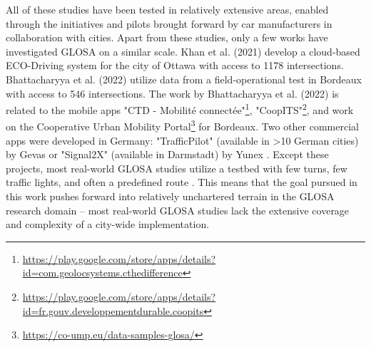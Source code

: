 All of these studies have been tested in relatively extensive areas, enabled through the initiatives and pilots brought forward by car manufacturers in collaboration with cities. Apart from these studies, only a few works have investigated GLOSA on a similar scale. Khan et al. (2021) \cite{khan_eco-drive_2021} develop a cloud-based ECO-Driving system for the city of Ottawa with access to 1178 intersections. Bhattacharyya et al. (2022) \cite{bhattacharyya_assessing_2022} utilize data from a field-operational test in Bordeaux with access to 546 intersections. The work by Bhattacharyya et al. (2022) \cite{bhattacharyya_assessing_2022} is related to the mobile apps "CTD - Mobilité connectée"\footnote{\url{https://play.google.com/store/apps/details?id=com.geolocsystems.cthedifference}}, "CoopITS"\footnote{\url{https://play.google.com/store/apps/details?id=fr.gouv.developpementdurable.coopits}}, and work on the Cooperative Urban Mobility Portal\footnote{\url{https://co-ump.eu/data-samples-glosa/}} for Bordeaux. Two other commercial apps were developed in Germany: "TrafficPilot" (available in >10 German cities) by Gevas or "Signal2X" (available in Darmstadt) by Yunex \cite{yunex_traffic_v2x-kommunikation_2023}. Except these projects, most real-world GLOSA studies utilize a testbed with few turns, few traffic lights, and often a predefined route \cite{iglesias_i2v_2008, schweiger_elisatm_2011, raubitschek_predictive_2011, koukoumidis_signalguru_2011, koukoumidis_leveraging_2012, hao_eco-approach_2019, fickas_fast_2019, chen_developing_2022}. This means that the goal pursued in this work pushes forward into relatively unchartered terrain in the GLOSA research domain -- most real-world GLOSA studies lack the extensive coverage and complexity of a city-wide implementation.

